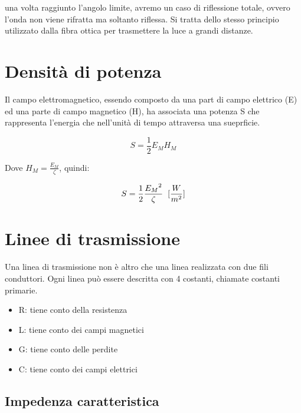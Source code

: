 \documentclass{article}
\begin{document}
    una volta raggiunto l'angolo limite, avremo un caso di riflessione totale, ovvero l'onda non viene rifratta ma soltanto riflessa.
    Si tratta dello stesso principio utilizzato dalla fibra ottica per trasmettere la luce a grandi distanze.

    \section{Densità di potenza}
    
    Il campo elettromagnetico, essendo composto da una part di campo elettrico (E) ed una parte di campo magnetico
    (H), ha associata una potenza S che rappresenta l'energia che nell'unità di tempo attraversa una sueprficie.

    \begin{equation}
        S = \frac{1}{2} E_M H_M
    \end{equation}

    Dove $H_M = \frac{E_M}{\zeta}$, quindi:

    \begin{equation}
        S = \frac{1}{2} \frac{{E_M}^2}{\zeta} \hspace{0.2cm} [\frac{W}{m^2}]
    \end{equation}

    \newpage

    \section{Linee di trasmissione}

    Una linea di trasmissione non è altro che una linea realizzata con due fili conduttori. Ogni linea può essere descritta
    con 4 costanti, chiamate costanti primarie. 

    \begin{itemize}
        \item R: tiene conto della resistenza
        \item L: tiene conto dei campi magnetici
        \item G: tiene conto delle perdite
        \item C: tiene conto dei campi elettrici
    \end{itemize}

    \subsection{Impedenza caratteristica}
\end{document}

